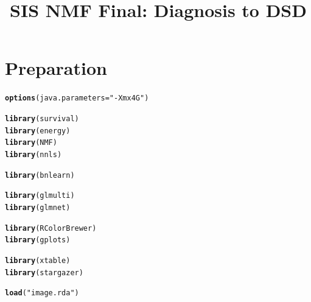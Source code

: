 \documentclass{article}\usepackage[]{graphicx}\usepackage[]{color}
\makeatletter
\newcommand{\hlstr}[1]{\textcolor[rgb]{0.192,0.494,0.8}{#1}}%
\newcommand{\hlstd}[1]{\textcolor[rgb]{0.345,0.345,0.345}{#1}}%
\newcommand{\hlkwc}[1]{\textcolor[rgb]{0.333,0.667,0.333}{#1}}%
\newcommand{\hlkwd}[1]{\textcolor[rgb]{0.737,0.353,0.396}{\textbf{#1}}}%
\newenvironment{kframe}{%
 \def\at@end@of@kframe{}%
 \ifinner\ifhmode%
  \def\at@end@of@kframe{\end{minipage}}%
  \begin{minipage}{\columnwidth}%
 \fi\fi%
 \def\FrameCommand##1{\hskip\@totalleftmargin \hskip-\fboxsep
 \colorbox{shadecolor}{##1}\hskip-\fboxsep
     \hskip-\linewidth \hskip-\@totalleftmargin \hskip\columnwidth}%
 \MakeFramed {\advance\hsize-\width
   \@totalleftmargin\z@ \linewidth\hsize
   \@setminipage}}%
 {\par\unskip\endMakeFramed%
 \at@end@of@kframe}
\newenvironment{knitrout}{}{} %
\makeatother
\begin{document}
\title{SIS NMF Final: Diagnosis to DSD}
\maketitle

\section{Preparation}
\begin{knitrout}
\color{fgcolor}\begin{kframe}
\begin{alltt}
\hlkwd{options}\hlstd{(}\hlkwc{java.parameters} \hlstd{=} \hlstr{"-Xmx4G"}\hlstd{)}

\hlkwd{library}\hlstd{(survival)}
\hlkwd{library}\hlstd{(energy)}
\hlkwd{library}\hlstd{(NMF)}
\hlkwd{library}\hlstd{(nnls)}

\hlkwd{library}\hlstd{(bnlearn)}

\hlkwd{library}\hlstd{(glmulti)}
\hlkwd{library}\hlstd{(glmnet)}

\hlkwd{library}\hlstd{(RColorBrewer)}
\hlkwd{library}\hlstd{(gplots)}

\hlkwd{library}\hlstd{(xtable)}
\hlkwd{library}\hlstd{(stargazer)}

\hlkwd{load}\hlstd{(}\hlstr{"image.rda"}\hlstd{)}
\end{alltt}
\end{kframe}
\end{knitrout}


\end{document}
